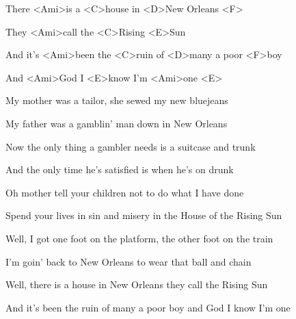 

\zs
There <Ami>is a <C>house in <D>New Orleans <F>

They <Ami>call the <C>Rising <E>Sun

And it's <Ami>been the <C>ruin of <D>many a poor <F>boy

And <Ami>God I <E>know I'm <Ami>one <E>
\ks

\zs
My mother was a tailor, she sewed my new bluejeans

My father was a gamblin' man down in New Orleans
\ks

\zs
Now the only thing a gambler needs is a suitcase and trunk

And the only time he's satisfied is when he's on drunk
\ks

\zs
Oh mother tell your children not to do what I have done

Spend your lives in sin and misery in the House of the Rising Sun
\ks

\zs
Well, I got one foot on the platform, the other foot on the train

I'm goin' back to New Orleans to wear that ball and chain
\ks

\zs
Well, there is a house in New Orleans they call the Rising Sun

And it's been the ruin of many a poor boy and God I know I'm one
\ks

\kp
